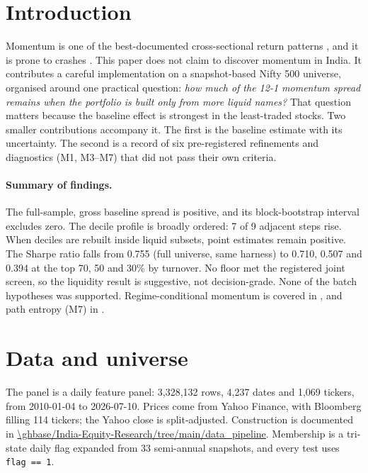 \documentclass[11pt]{article}
\begin{document}
\section{Introduction}

Momentum is one of the best-documented cross-sectional return patterns
\citep{jegadeesh1993,asness2013}, and it is prone to crashes \citep{daniel2016,barroso2015}.
This paper does not claim to discover momentum in India. It contributes a careful
implementation on a snapshot-based Nifty 500 universe, organised around one practical
question: \emph{how much of the 12-1 momentum spread remains when the portfolio is built
only from more liquid names?} That question matters because the baseline effect is
strongest in the least-traded stocks. Two smaller contributions accompany it. The first
is the baseline estimate with its uncertainty. The second is a record of six
pre-registered refinements and diagnostics (M1, M3--M7) that did not pass their own
criteria.

\paragraph{Summary of findings.} The full-sample, gross baseline spread is positive, and
its block-bootstrap interval excludes zero. The decile profile is broadly ordered: 7 of 9
adjacent steps rise. When deciles are rebuilt inside liquid subsets, point estimates
remain positive. The Sharpe ratio falls from 0.755 (full universe, same harness) to
0.710, 0.507 and 0.394 at the top 70, 50 and 30\% by turnover. No floor met the
registered joint screen, so the liquidity result is suggestive, not decision-grade. None
of the batch hypotheses was supported. Regime-conditional momentum is covered in
\citet{sahi_irfa}, and path entropy (M7) in \citet{sahi_pathtexture}.

\section{Data and universe}

The panel is a daily feature panel: 3,328,132 rows, 4,237 dates and 1,069 tickers, from
2010-01-04 to 2026-07-10. Prices come from Yahoo Finance, with Bloomberg filling 114
tickers; the Yahoo close is split-adjusted. Construction is documented in
\url{\ghbase/India-Equity-Research/tree/main/data_pipeline}. Membership is a tri-state daily flag expanded from 33
semi-annual snapshots, and every test uses \texttt{flag == 1}.
\end{document}
